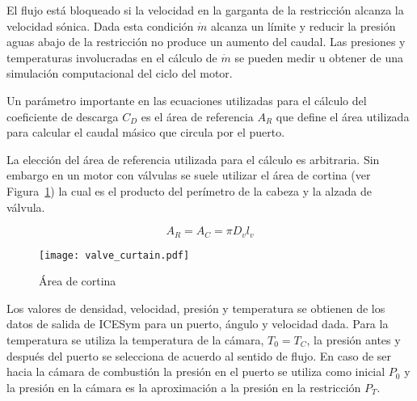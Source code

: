
El flujo está bloqueado si la velocidad en la garganta de la restricción
alcanza la velocidad sónica. 
%
Dada esta condición $\dot{m}$ alcanza un límite y reducir la presión aguas
abajo de la restricción no produce un aumento del caudal.
%
%
Las presiones y temperaturas involucradas en el cálculo de $\dot{m}$ se pueden
medir u obtener de una simulación computacional del ciclo del motor.
%

Un parámetro importante en las ecuaciones utilizadas para el cálculo del
coeficiente de descarga $C_{D}$ es el área de referencia $A_{R}$ que define el
área utilizada para calcular el caudal másico que circula por el puerto.
%

La elección del área de referencia utilizada para el cálculo es arbitraria.
%
Sin embargo en un motor con válvulas se suele utilizar el área de cortina (ver
Figura~\ref{fig:area_cortina}) la cual es el producto del perímetro de la
cabeza y la alzada de válvula.

\begin{equation} \label{eq:area_cortina}
  A_R = A_C = \pi D_v l_v
\end{equation}


\begin{figure} \centering
\texttt{[image: valve\_curtain.pdf]}
  \caption{Área de cortina}\label{fig:area_cortina}
\end{figure}

Los valores de densidad, velocidad, presión y temperatura se obtienen de los
datos de salida de ICESym para un puerto, ángulo y velocidad dada.
%
Para la temperatura se utiliza la temperatura de la cámara, $T_0 = T_C$, la
presión antes y después del puerto se selecciona de acuerdo al sentido de
flujo.
%
En caso de ser hacia la cámara de combustión la presión en el puerto se utiliza
como inicial $P_0$ y la presión en la cámara es la aproximación a la presión en
la restricción $P_T$.
%
%

